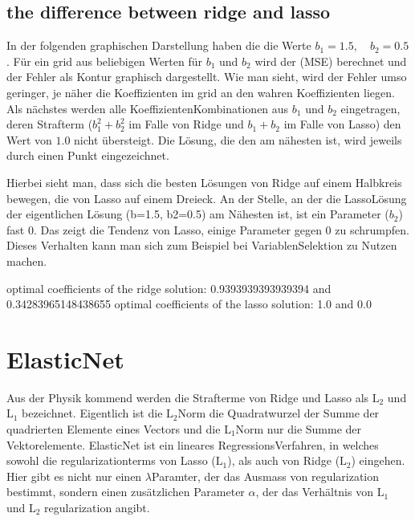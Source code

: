 \documentclass[letterpaper,10pt,english]{jupyterBook}
\begin{document}
\section{the difference between ridge and lasso}
\label{\detokenize{Regression_Techniques:the-difference-between-ridge-and-lasso}}
\sphinxAtStartPar
In der folgenden graphischen Darstellung haben die  die Werte \(b_1=1.5,\quad b_2=0.5\). Für ein grid aus beliebigen Werten für \(b_1\) und \(b_2\) wird der  (MSE) berechnet und der Fehler als Kontur graphisch dargestellt. Wie man sieht, wird der Fehler umso geringer, je näher die Koeffizienten im grid an den wahren Koeffizienten liegen.
Als nächstes werden alle Koeffizienten\sphinxhyphen{}Kombinationen aus \(b_1\) und \(b_2\) eingetragen, deren Strafterm (\(b_1^2 + b_2^2\)
im Falle von Ridge und \(b_1 + b_2\) im Falle von Lasso) den Wert von \(1.0\) nicht übersteigt. Die Lösung, die den  am nähesten ist, wird jeweils durch einen Punkt eingezeichnet.

\sphinxAtStartPar
Hierbei sieht man, dass sich die besten Lösungen von
Ridge auf einem Halbkreis bewegen, die von Lasso auf einem Dreieck. An der Stelle, an der die Lasso\sphinxhyphen{}Lösung der eigentlichen Lösung (b=1.5, b2=0.5) am Nähesten ist, ist ein Parameter (\(b_2\)) fast \(0\). Das zeigt die Tendenz von Lasso, einige Parameter gegen \(0\) zu schrumpfen. Dieses Verhalten kann man sich zum Beispiel bei Variablen\sphinxhyphen{}Selektion zu Nutzen machen.

\noindent{}

\begin{sphinxVerbatim}[commandchars=\\\{\}]
optimal coefficients of the ridge solution: 0.9393939393939394 and 0.34283965148438655
optimal coefficients of the lasso solution: 1.0 and 0.0
\end{sphinxVerbatim}


\chapter{ElasticNet}
\label{\detokenize{Regression_Techniques:elasticnet}}
\sphinxAtStartPar
Aus der Physik kommend werden die Strafterme von Ridge und Lasso als \(\text{L}_2\) und \(\text{L}_1\) bezeichnet. Eigentlich ist die \(\text{L}_2\)\sphinxhyphen{}Norm die Quadratwurzel der Summe der quadrierten Elemente eines Vectors und die \(\text{L}_1\)\sphinxhyphen{}Norm nur die Summe der Vektorelemente.
ElasticNet ist ein lineares Regressions\sphinxhyphen{}Verfahren, in welches sowohl die regularization\sphinxhyphen{}terms von Lasso (\(\text{L}_1\)), als auch von Ridge (\(\text{L}_2\)) eingehen. Hier gibt es nicht nur einen \(\lambda\)\sphinxhyphen{}Paramter, der das Ausmass von regularization bestimmt, sondern einen zusätzlichen Parameter \(\alpha\), der das Verhältnis von \(\text{L}_1\) und \(\text{L}_2\) regularization angibt.
\end{document}
